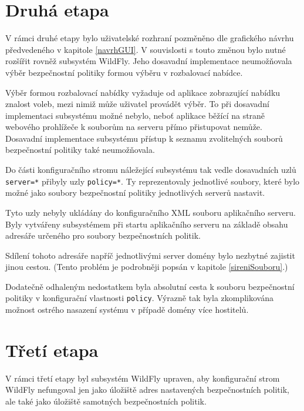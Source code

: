 \section{Druhá etapa}

V rámci druhé etapy bylo uživatelské rozhraní pozměněno dle grafického návrhu předvedeného v kapitole \ref{navrhGUI}. V souvislosti s touto změnou bylo nutné rozšířit rovněž subsystém WildFly. Jeho dosavadní implementace neumožňovala výběr bezpečnostní politiky formou výběru v rozbalovací nabídce.

Výběr formou rozbalovací nabídky vyžaduje od aplikace zobrazující nabídku znalost voleb, mezi nimiž může uživatel provádět výběr.
To při dosavadní implementaci subsystému možné nebylo, neboť aplikace běžící na straně webového prohlížeče k souborům na serveru přímo přistupovat nemůže.
Dosavadní implementace subsystému přístup k seznamu zvolitelných souborů bezpečnostní politiky také neumožňovala.

Do části konfiguračního stromu náležející subsystému tak vedle dosavadních uzlů {\tt server=*} přibyly uzly {\tt policy=*}.
Ty reprezentovaly jednotlivé soubory, které bylo možné jako soubory bezpečnostní politiky jednotlivých serverů nastavit.

Tyto uzly nebyly ukládány do konfiguračního XML souboru aplikačního serveru.
Byly vytvářeny subsystémem při startu aplikačního serveru na základě obsahu adresáře určeného pro soubory bezpečnostních politik.

Sdílení tohoto adresáře napříč jednotlivými server domény bylo nezbytné zajistit jinou cestou. (Tento problém je podrobněji popsán v kapitole \ref{sireniSouboru}.)

Dodatečně odhaleným nedostatkem byla absolutní cesta k souboru bezpečnostní politiky v konfigurační vlastnosti {\tt policy}.
Výrazně tak byla zkomplikována možnost ostrého nasazení systému v případě domény více hostitelů.

\section{Třetí etapa}

V rámci třetí etapy byl subsystém WildFly upraven, aby konfigurační strom WildFly nefungoval jen jako úložiště adres nastavených bezpečnostních politik, ale také jako úložiště samotných bezpečnostních politik.

